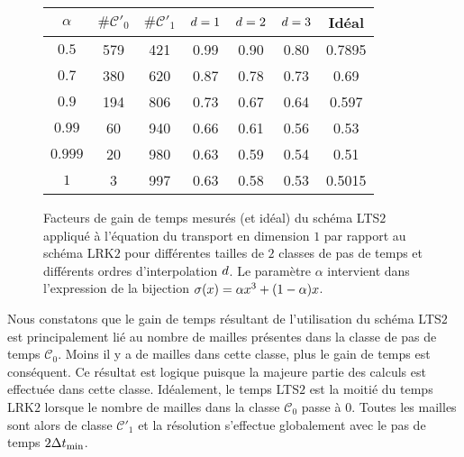 \begin{figure}[!h]
	\begin{center}
		\caption{
			\label{tab:ader_trans_perf}
			Facteurs de gain de temps mesurés (et idéal) du schéma LTS$2$
			appliqué à l'équation du transport en dimension $1$
			par rapport au schéma LRK$2$ pour différentes
			tailles de $2$ classes de pas de temps
			et différents ordres d'interpolation $d$.
			Le paramètre $\alpha$ intervient dans l'expression de la
			bijection $\sigma(x) = \alpha x^3 + (1 - \alpha) x$.
		}
		
		\begin{tabular}{|c|c|c|c|c|c|c|}
			\hline
			$\alpha$ & $\#{\mathcal{C}'}_0$ & $\#{\mathcal{C}'}_1$ & $d = 1$ & $d = 2$ & $d = 3$ & Idéal \\ \hline\hline
			$0.5$ & 579 & 421 & 0.99 & 0.90 & 0.80 & 0.7895 \\	\hline
			$0.7$ & 380 & 620 & 0.87 & 0.78 & 0.73 & 0.69 \\	\hline
			$0.9$ & 194 & 806 & 0.73 & 0.67 & 0.64 & 0.597 \\	\hline
			$0.99$ & 60 & 940 & 0.66 & 0.61 & 0.56 & 0.53 \\	\hline
			$0.999$ & 20 & 980 & 0.63 & 0.59 & 0.54 & 0.51 \\	\hline
			$1$ & 3 & 997 & 0.63 & 0.58 & 0.53 & 0.5015 \\	\hline
		\end{tabular}
	\end{center}
\end{figure}

Nous constatons que le gain de temps résultant de l'utilisation du schéma LTS$2$
est principalement lié au nombre de mailles présentes dans la classe
de pas de temps $\mathcal{C}_0$.
Moins il y a de mailles dans cette classe, plus le gain de temps est conséquent.
Ce résultat est logique puisque la majeure partie des calculs est effectuée
dans cette classe.
Idéalement, le temps LTS$2$ est la moitié du temps LRK$2$ lorsque
le nombre de mailles dans la classe $\mathcal{C}_0$ passe à $0$.
Toutes les mailles sont alors de classe ${\mathcal{C}'}_1$ et la
résolution s'effectue globalement avec le pas de temps $2 \Delta t_{\min}$.

